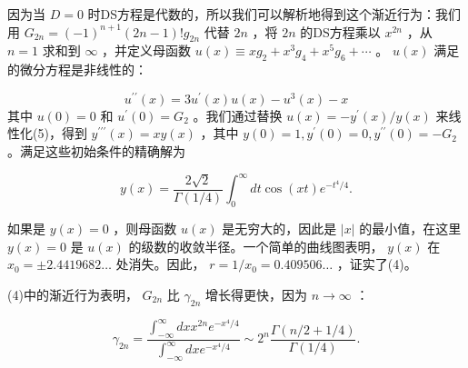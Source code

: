 \documentclass[UTF8]{article}
\begin{document}
因为当 $D=0$ 时DS方程是代数的，所以我们可以解析地得到这个渐近行为：我们用 $G_{2 n}=(-1)^{n+1}(2 n-1) ! g_{2 n}$ 代替 $2 n$ ，将 $2 n$ 的DS方程乘以 $x^{2 n}$ ，从 $n=1$ 求和到 $\infty$ ，并定义母函数 $u(x) \equiv x g_2+x^3 g_4+x^5 g_6+\cdots$ 。 $u(x)$ 满足的微分方程是非线性的：




 $$u^{\prime \prime}(x)=3 u^{\prime}(x) u(x)-u^3(x)-x
$$ 其中 $u(0)=0$ 和 $u^{\prime}(0)=G_2$ 。我们通过替换 $u(x)=-y^{\prime}(x) / y(x)$ 来线性化(5)，得到 $y^{\prime \prime \prime}(x)=x y(x)$ ，其中 $y(0)=1, y^{\prime}(0)=0, y^{\prime \prime}(0)=-G_2$ 。满足这些初始条件的精确解为




 $$y(x)=\frac{2 \sqrt{2}}{\Gamma(1 / 4)} \int_0^{\infty} d t \cos (x t) e^{-t^4 / 4} .
$$ 


如果是 $y(x)=0$ ，则母函数 $u(x)$ 是无穷大的，因此是 $|x|$ 的最小值，在这里 $y(x)=0$ 是 $u(x)$ 的级数的收敛半径。一个简单的曲线图表明， $y(x)$ 在 $x_0= \pm 2.4419682 \ldots$ 处消失。因此， $r=1 / x_0=0.409506 \ldots$ ，证实了(4)。




(4)中的渐近行为表明， $G_{2 n}$ 比 $\gamma_{2 n}$ 增长得更快，因为 $n \rightarrow \infty$ ：


 $$
\gamma_{2 n}=\frac{\int_{-\infty}^{\infty} d x x^{2 n} e^{-x^4 / 4}}{\int_{-\infty}^{\infty} d x e^{-x^4 / 4}} \sim 2^n \frac{\Gamma(n / 2+1 / 4)}{\Gamma(1 / 4)} .
$$ 
\end{document}
